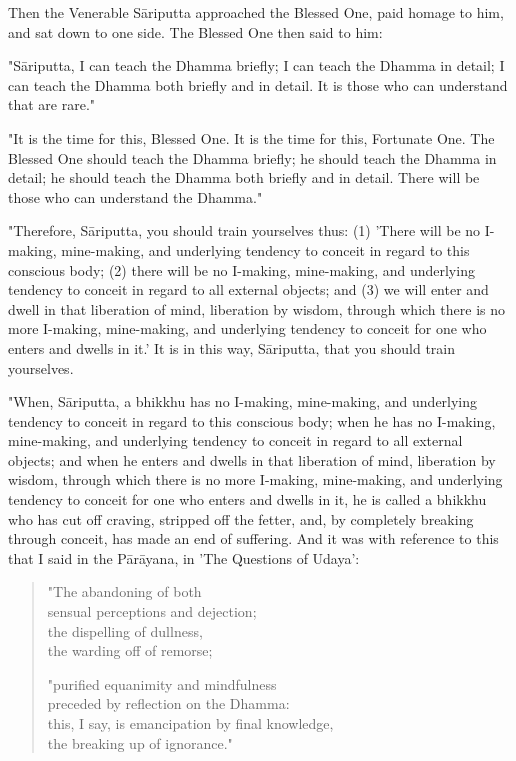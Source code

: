 Then the Venerable Sāriputta approached the Blessed One, paid homage to him, and sat down to one side. The Blessed One then said to him:


"Sāriputta, I can teach the Dhamma briefly; I can teach the Dhamma in detail; I can teach the Dhamma both briefly and in detail. It is those who can understand that are rare."


"It is the time for this, Blessed One. It is the time for this, Fortunate One. The Blessed One should teach the Dhamma briefly; he should teach the Dhamma in detail; he should teach the Dhamma both briefly and in detail. There will be those who can understand the Dhamma."


"Therefore, Sāriputta, you should train yourselves thus: (1) 'There will be no I-making, mine-making, and underlying tendency to conceit in regard to this conscious body; (2) there will be no I-making, mine-making, and underlying tendency to conceit in regard to all external objects; and (3) we will enter and dwell in that liberation of mind, liberation by wisdom, through which there is no more I-making, mine-making, and underlying tendency to conceit for one who enters and dwells in it.' It is in this way, Sāriputta, that you should train yourselves.


"When, Sāriputta, a bhikkhu has no I-making, mine-making, and underlying tendency to conceit in regard to this conscious body; when he has no I-making, mine-making, and underlying tendency to conceit in regard to all external objects; and when he enters and dwells in that liberation of mind, liberation by wisdom, through which there is no more I-making, mine-making, and underlying tendency to conceit for one who enters and dwells in it, he is called a bhikkhu who has cut off craving, stripped off the fetter, and, by completely breaking through conceit, has made an end of suffering. And it was with reference to this that I said in the Pārāyana, in 'The Questions of Udaya':


\begin{quotation}
"The abandoning of both \\
sensual perceptions and dejection; \\
the dispelling of dullness, \\
the warding off of remorse;


"purified equanimity and mindfulness \\
preceded by reflection on the Dhamma: \\
this, I say, is emancipation by final knowledge, \\
the breaking up of ignorance."


\end{quotation}


